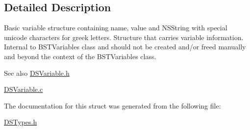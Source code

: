 \subsection{Detailed Description}
Basic variable structure containing name, value and NSString with special unicode characters for greek letters. Structure that carries variable information. Internal to BSTVariables class and should not be created and/or freed manually and beyond the context of the BSTVariables class.

\begin{DoxySeeAlso}{See also}
\hyperlink{_d_s_variable_8h}{DSVariable.h} 

\hyperlink{_d_s_variable_8c}{DSVariable.c} 
\end{DoxySeeAlso}


The documentation for this struct was generated from the following file:\begin{DoxyCompactItemize}
\item 
\hyperlink{_d_s_types_8h}{DSTypes.h}\end{DoxyCompactItemize}
